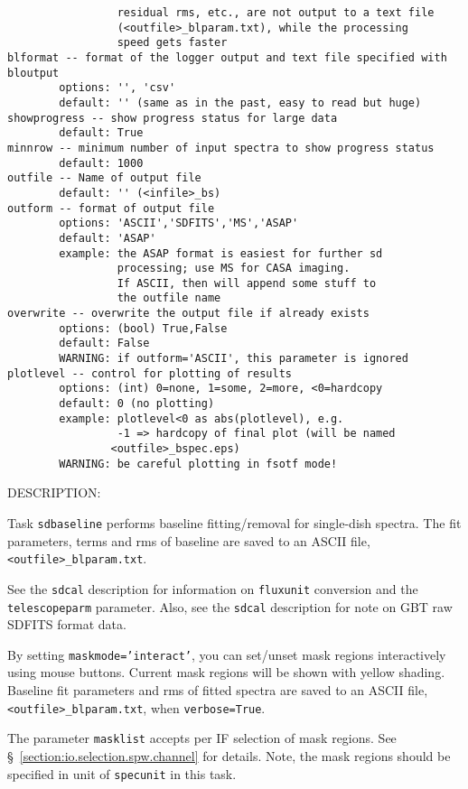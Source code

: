 \begin{verbatim}
                 residual rms, etc., are not output to a text file 
                 (<outfile>_blparam.txt), while the processing 
                 speed gets faster
blformat -- format of the logger output and text file specified with bloutput
        options: '', 'csv'
        default: '' (same as in the past, easy to read but huge)
showprogress -- show progress status for large data
        default: True
minnrow -- minimum number of input spectra to show progress status
        default: 1000
outfile -- Name of output file
        default: '' (<infile>_bs)
outform -- format of output file
        options: 'ASCII','SDFITS','MS','ASAP'
        default: 'ASAP'
        example: the ASAP format is easiest for further sd
                 processing; use MS for CASA imaging.
                 If ASCII, then will append some stuff to
                 the outfile name
overwrite -- overwrite the output file if already exists
        options: (bool) True,False
        default: False
        WARNING: if outform='ASCII', this parameter is ignored
plotlevel -- control for plotting of results
        options: (int) 0=none, 1=some, 2=more, <0=hardcopy
        default: 0 (no plotting)
        example: plotlevel<0 as abs(plotlevel), e.g.
                 -1 => hardcopy of final plot (will be named
                <outfile>_bspec.eps)
        WARNING: be careful plotting in fsotf mode!

\end{verbatim}

DESCRIPTION:

Task {\tt sdbaseline} performs baseline fitting/removal for single-dish spectra.
The fit parameters, terms and rms of baseline are saved to an ASCII
file, {\tt <outfile>\_blparam.txt}.

See the {\tt sdcal} description for information on {\tt fluxunit} 
conversion and the {\tt telescopeparm} parameter.
Also, see the {\tt sdcal} description for note on GBT raw SDFITS format data.

By setting {\tt maskmode='interact'}, you can set/unset mask regions interactively using
mouse buttons. Current mask regions will be shown with yellow shading.
Baseline fit parameters and rms of fitted spectra are saved to an
ASCII file, {\tt <outfile>\_blparam.txt}, when {\tt verbose=True}.

The parameter {\tt masklist} accepts per IF selection of mask regions. 
See \S~\ref{section:io.selection.spw.channel} for details. 
Note, the mask regions should be specified in unit of {\tt specunit} 
in this task.

